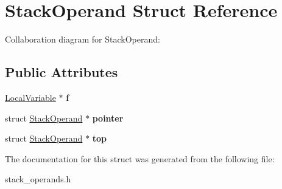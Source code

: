 \hypertarget{structStackOperand}{}\section{Stack\+Operand Struct Reference}
\label{structStackOperand}


Collaboration diagram for Stack\+Operand\+:
\subsection*{Public Attributes}
\begin{DoxyCompactItemize}
\item 
\hyperlink{structLocalVariable}{Local\+Variable} $\ast$ {\bfseries f}\hypertarget{structStackOperand_ac2430d118d01240603507706e8a8adff}{}\label{structStackOperand_ac2430d118d01240603507706e8a8adff}

\item 
struct \hyperlink{structStackOperand}{Stack\+Operand} $\ast$ {\bfseries pointer}\hypertarget{structStackOperand_af4ad4c3c4e49be261c61b3856bc02b9f}{}\label{structStackOperand_af4ad4c3c4e49be261c61b3856bc02b9f}

\item 
struct \hyperlink{structStackOperand}{Stack\+Operand} $\ast$ {\bfseries top}\hypertarget{structStackOperand_a11a33c73ab08f65a14fb53af2308d052}{}\label{structStackOperand_a11a33c73ab08f65a14fb53af2308d052}

\end{DoxyCompactItemize}


The documentation for this struct was generated from the following file\+:\begin{DoxyCompactItemize}
\item 
stack\+\_\+operands.\+h\end{DoxyCompactItemize}
